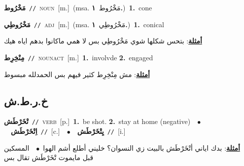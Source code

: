 \documentclass[10pt,a4paper,twoside]{article} %
\begin{document}
\begin{multicols}{2}
{\setlength\topsep{0pt}\textbf{\foreignlanguage{arabic}{مَخْرُوط}}\ {\color{gray}\texttt{//}\color{black}}\ \textsc{noun}\ [m.]\ \color{gray}(msa. \foreignlanguage{arabic}{مَخْرُوط}~\foreignlanguage{arabic}{\textbf{١.}})\color{black}\ \textbf{1.}~cone\ } \vspace{2mm}

{\setlength\topsep{0pt}\textbf{\foreignlanguage{arabic}{مَخْرُوطِي}}\ {\color{gray}\texttt{//}\color{black}}\ \textsc{adj}\ [m.]\ \color{gray}(msa. \foreignlanguage{arabic}{مَخْرُوطِي}~\foreignlanguage{arabic}{\textbf{١.}})\color{black}\ \textbf{1.}~conical\  \begin{flushright}\color{gray}\foreignlanguage{arabic}{\textbf{\underline{\foreignlanguage{arabic}{أمثلة}}}: بتحس شكلها شوي مَخْرُوطِي بس لا همي ماكانوا بدهم اياه هيك}\end{flushright}\color{black}} \vspace{2mm}

{\setlength\topsep{0pt}\textbf{\foreignlanguage{arabic}{مِنْخِرِط}}\ {\color{gray}\texttt{//}\color{black}}\ \textsc{noun\textunderscore act}\ [m.]\ \textbf{1.}~involvde  \textbf{2.}~engaged\  \begin{flushright}\color{gray}\foreignlanguage{arabic}{\textbf{\underline{\foreignlanguage{arabic}{أمثلة}}}: مش مِنْخِرِط كثير فيهم بس الحمدلله مبسوط}\end{flushright}\color{black}} \vspace{2mm}

\vspace{-3mm}
\subsection*{\color{blue}\foreignlanguage{arabic}{خ.ر.ط.ش}\color{blue}{}} 

{\setlength\topsep{0pt}\textbf{\foreignlanguage{arabic}{تْخَرْطَش}}\ {\color{gray}\texttt{//}\color{black}}\ \textsc{verb}\ [p.]\ \textbf{1.}~be shot.  \textbf{2.}~stay at home (negative)\ \ $\bullet$\ \ \setlength\topsep{0pt}\textbf{\foreignlanguage{arabic}{اِتْخَرْطَش}}\ {\color{gray}\texttt{//}\color{black}}\ [c.]\ \ $\bullet$\ \ \setlength\topsep{0pt}\textbf{\foreignlanguage{arabic}{يِتْخَرْطَش}}\ {\color{gray}\texttt{//}\color{black}}\ [i.]\  \begin{flushright}\color{gray}\foreignlanguage{arabic}{\textbf{\underline{\foreignlanguage{arabic}{أمثلة}}}: بدك اياني أتْخَرْطَش بالبيت زي النسوان؟ خليني أطلع أشم الهوا\ $\bullet$\ \  المسكين قبل مايموت تْخَرْطَش تقال بس}\end{flushright}\color{black}} \vspace{2mm}


\end{multicols}
\end{document}
